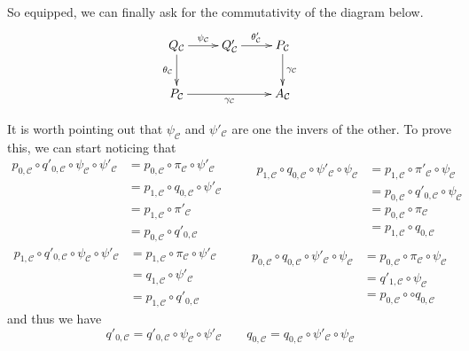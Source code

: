 \documentclass[a4paper,UKenglish,cleveref,pdftex,thm-restate,numberwithinsect]{lipics-v2021}
\begin{document}
\begin{definition}
\begin{enumerate}
	So equipped, we can finally ask for the commutativity of the diagram below.
	\[\xymatrix{Q_{\mathcal{C}}\ar[d]_{\theta_{\mathcal{C}}} \ar[r]^{\psi_{\mathcal{C}}}& Q_{\mathcal{C}}' \ar[r]^{\theta_{\mathcal{C}}'} & P_{\mathcal{C}} \ar[d]^{\gamma_{\mathcal{C}}}\\ P_{\mathcal{C}} \ar[rr]_{\gamma_{\mathcal{C}}}&& A_{\mathcal{C}}}\]
\end{enumerate}
\end{definition}

\begin{remark}\label{rem:iso}
It is worth pointing out that $\psi_{\mathcal{C}}$ and $\psi'_{\mathcal{C}}$ are one the invers of the other. To prove this, we can start noticing that
\[\begin{split}
	p_{0, \mathcal{C}}\circ q'_{0, \mathcal{C}}\circ \psi_{\mathcal{C}}\circ \psi'_{\mathcal{C}}&=p_{0, \mathcal{C}}\circ \pi_{\mathcal{C}}\circ \psi'_{\mathcal{C}}\\&= p_{1, \mathcal{C}} \circ q_{0, \mathcal{C}} \circ \psi'_{\mathcal{C}}\\&=p_{1, \mathcal{C}}\circ \pi'_{\mathcal{C}}\\&= p_{0, \mathcal{C}}\circ q'_{0, \mathcal{C}}
\end{split}\qquad \begin{split}
	p_{1, \mathcal{C}}\circ q_{0, \mathcal{C}}\circ \psi'_{\mathcal{C}}\circ \psi_{\mathcal{C}}&=p_{1, \mathcal{C}}\circ \pi'_{\mathcal{C}}\circ \psi_{\mathcal{C}}\\&= p_{0, \mathcal{C}} \circ q'_{0, \mathcal{C}} \circ \psi_{\mathcal{C}}\\&=p_{0, \mathcal{C}}\circ \pi_{\mathcal{C}}\\&= p_{1, \mathcal{C}}\circ q_{0, \mathcal{C}}
\end{split}\]
\[\begin{split}
	p_{1, \mathcal{C}}\circ q'_{0, \mathcal{C}}\circ \psi_{\mathcal{C}}\circ \psi'_{\mathcal{C}}&=p_{1, \mathcal{C}}\circ \pi_{\mathcal{C}}\circ \psi'_{\mathcal{C}}\\&= q_{1, \mathcal{C}} \circ \psi'_{\mathcal{C}}\\&=p_{1, \mathcal{C}}\circ q'_{0, \mathcal{C}}
\end{split}\qquad \begin{split}
	p_{0, \mathcal{C}}\circ q_{0, \mathcal{C}}\circ \psi'_{\mathcal{C}}\circ \psi_{\mathcal{C}}&=p_{0, \mathcal{C}}\circ \pi_{\mathcal{C}}\circ \psi_{\mathcal{C}}\\&= q'_{1, \mathcal{C}} \circ \psi_{\mathcal{C}}\\&=p_{0, \mathcal{C}}\circ \circ q_{0, \mathcal{C}}
\end{split}\]
and thus we have
\[q'_{0, \mathcal{C}}=q'_{0, \mathcal{C}}\circ \psi_{\mathcal{C}}\circ \psi'_{\mathcal{C}} \qquad q_{0, \mathcal{C}} = q_{0, \mathcal{C}}\circ \psi'_{\mathcal{C}}\circ \psi_{\mathcal{C}}\]


\end{remark}
\end{document}
